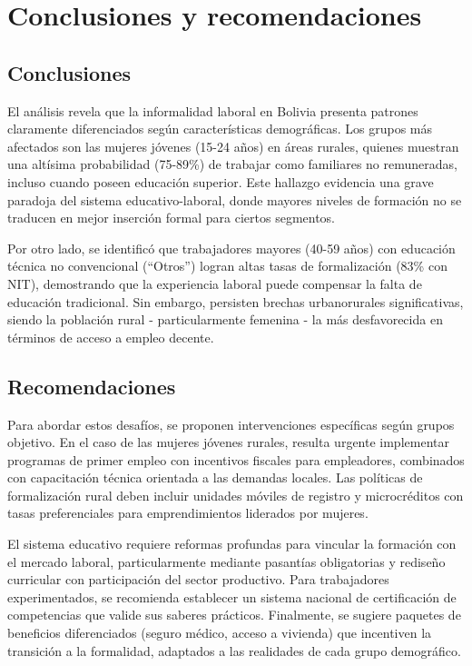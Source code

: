 \documentclass[Royal,times,sageh]{sagej}
\begin{document}
\section{Conclusiones y
recomendaciones}\label{conclusiones-y-recomendaciones}

\subsection{Conclusiones}\label{conclusiones}

El análisis revela que la informalidad laboral en Bolivia presenta
patrones claramente diferenciados según características demográficas.
Los grupos más afectados son las mujeres jóvenes (15-24 años) en áreas
rurales, quienes muestran una altísima probabilidad (75-89\%) de
trabajar como familiares no remuneradas, incluso cuando poseen educación
superior. Este hallazgo evidencia una grave paradoja del sistema
educativo-laboral, donde mayores niveles de formación no se traducen en
mejor inserción formal para ciertos segmentos.

Por otro lado, se identificó que trabajadores mayores (40-59 años) con
educación técnica no convencional (``Otros'') logran altas tasas de
formalización (83\% con NIT), demostrando que la experiencia laboral
puede compensar la falta de educación tradicional. Sin embargo,
persisten brechas urbanorurales significativas, siendo la población
rural - particularmente femenina - la más desfavorecida en términos de
acceso a empleo decente.

\subsection{Recomendaciones}\label{recomendaciones}

Para abordar estos desafíos, se proponen intervenciones específicas
según grupos objetivo. En el caso de las mujeres jóvenes rurales,
resulta urgente implementar programas de primer empleo con incentivos
fiscales para empleadores, combinados con capacitación técnica orientada
a las demandas locales. Las políticas de formalización rural deben
incluir unidades móviles de registro y microcréditos con tasas
preferenciales para emprendimientos liderados por mujeres.

El sistema educativo requiere reformas profundas para vincular la
formación con el mercado laboral, particularmente mediante pasantías
obligatorias y rediseño curricular con participación del sector
productivo. Para trabajadores experimentados, se recomienda establecer
un sistema nacional de certificación de competencias que valide sus
saberes prácticos. Finalmente, se sugiere paquetes de beneficios
diferenciados (seguro médico, acceso a vivienda) que incentiven la
transición a la formalidad, adaptados a las realidades de cada grupo
demográfico.
\end{document}
